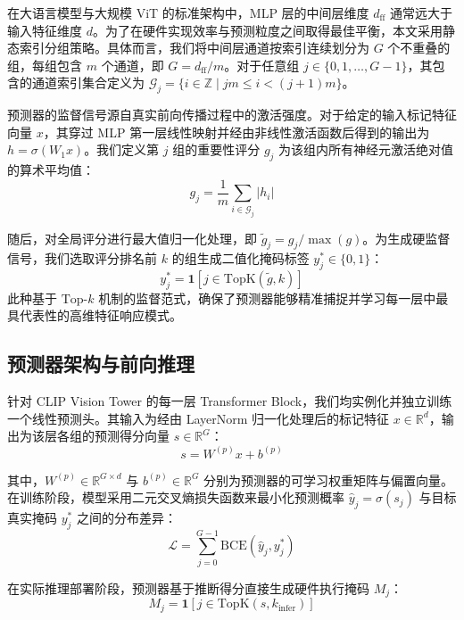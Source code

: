\documentclass[sigconf]{acmart}
\begin{document}
	在大语言模型与大规模 ViT 的标准架构中，MLP 层的中间层维度 $d_{\mathrm{ff}}$ 通常远大于输入特征维度 $d$。为了在硬件实现效率与预测粒度之间取得最佳平衡，本文采用静态索引分组策略。具体而言，我们将中间层通道按索引连续划分为 $G$ 个不重叠的组，每组包含 $m$ 个通道，即 $G = d_{\mathrm{ff}} / m$。对于任意组 $j \in \{0, 1, \dots, G-1\}$，其包含的通道索引集合定义为 $\mathcal{G}_j = \{i \in \mathbb{Z} \mid jm \le i < (j+1)m \}$。
	
	预测器的监督信号源自真实前向传播过程中的激活强度。对于给定的输入标记特征向量 $x$，其穿过 MLP 第一层线性映射并经由非线性激活函数后得到的输出为 $h = \sigma(W_1 x)$。我们定义第 $j$ 组的重要性评分 $g_j$ 为该组内所有神经元激活绝对值的算术平均值：
	\begin{equation}
		g_j = \frac{1}{m}\sum_{i \in \mathcal{G}_j} |h_i|
	\end{equation}
	
	随后，对全局评分进行最大值归一化处理，即 $\tilde{g}_j = g_j / \max(g)$。为生成硬监督信号，我们选取评分排名前 $k$ 的组生成二值化掩码标签 $y_j^{*} \in \{0, 1\}$：
	\begin{equation}
		y_j^{*} = \mathbf{1}[j \in \mathrm{TopK}(\tilde{g}, k)]
	\end{equation}
	此种基于 $\mathrm{Top\text{-}}k$ 机制的监督范式，确保了预测器能够精准捕捉并学习每一层中最具代表性的高维特征响应模式。
	
	\subsection{预测器架构与前向推理}

	针对 CLIP Vision Tower 的每一层 Transformer Block，我们均实例化并独立训练一个线性预测头。其输入为经由 LayerNorm 归一化处理后的标记特征 $x \in \mathbb{R}^d$，输出为该层各组的预测得分向量 $s \in \mathbb{R}^G$：
	\begin{equation}
		s = W^{(p)} x + b^{(p)}
	\end{equation}

	其中，$W^{(p)} \in \mathbb{R}^{G \times d}$ 与 $b^{(p)} \in \mathbb{R}^G$ 分别为预测器的可学习权重矩阵与偏置向量。在训练阶段，模型采用二元交叉熵损失函数来最小化预测概率 $\hat{y}_j = \sigma(s_j)$ 与目标真实掩码 $y_j^{*}$ 之间的分布差异：
	\begin{equation}
		\mathcal{L} = \sum_{j=0}^{G-1} \mathrm{BCE}(\hat{y}_{j}, y_{j}^{*})
	\end{equation}
	
	在实际推理部署阶段，预测器基于推断得分直接生成硬件执行掩码 $M_j$：
	\begin{equation}
		M_j = \mathbf{1}[j \in \mathrm{TopK}(s, k_{\mathrm{infer}})]
	\end{equation}
\end{document}
